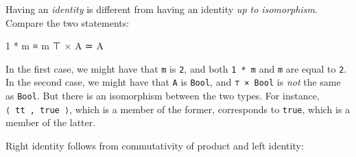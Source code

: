 Having an \emph{identity} is different from having an identity \emph{up
to isomorphism}. Compare the two statements:

\begin{myDisplay}
1 * m ≡ m
⊤ × A ≃ A
\end{myDisplay}

In the first case, we might have that \texttt{m} is \texttt{2}, and both
\texttt{1\ *\ m} and \texttt{m} are equal to \texttt{2}. In the second
case, we might have that \texttt{A} is \texttt{Bool}, and
\texttt{⊤\ ×\ Bool} is \emph{not} the same as \texttt{Bool}. But there
is an isomorphism between the two types. For instance,
\texttt{⟨\ tt\ ,\ true\ ⟩}, which is a member of the former, corresponds
to \texttt{true}, which is a member of the latter.

Right identity follows from commutativity of product and left identity:

\begin{fence}
\begin{code}%
\>[0]\AgdaSpace{}%
\AgdaSymbol{:}\AgdaSpace{}%
\AgdaSpace{}%
\AgdaSymbol{\{}\AgdaSpace{}%
\AgdaSymbol{:}\AgdaSpace{}%
\AgdaSymbol{\}}\AgdaSpace{}%
\AgdaSpace{}%
\AgdaSymbol{(}\AgdaSpace{}%
\AgdaSpace{}%
\AgdaSymbol{)}\AgdaSpace{}%
\AgdaSpace{}%
\<%
\\
\>[0]\AgdaSpace{}%
\AgdaSymbol{\{}\AgdaSymbol{\}}\AgdaSpace{}%
\AgdaSymbol{=}\<%
\\
\>[0][@{}l@{\AgdaIndent{0}}]%
\>[2]\<%
\\
\>[2][@{}l@{\AgdaIndent{0}}]%
\>[4]\AgdaSymbol{(}\AgdaSpace{}%
\AgdaSpace{}%
\AgdaSymbol{)}\<%
\\
%
\>[2]\AgdaSpace{}%
\AgdaSpace{}%
\<%
\\
\>[2][@{}l@{\AgdaIndent{0}}]%
\>[4]\AgdaSymbol{(}\AgdaSpace{}%
\AgdaSpace{}%
\AgdaSymbol{)}\<%
\\
%
\>[2]\AgdaSpace{}%
\AgdaSpace{}%
\<%
\\
\>[2][@{}l@{\AgdaIndent{0}}]%
\>[4]\<%
\\
%
\>[2]\<%
\end{code}
\end{fence}

